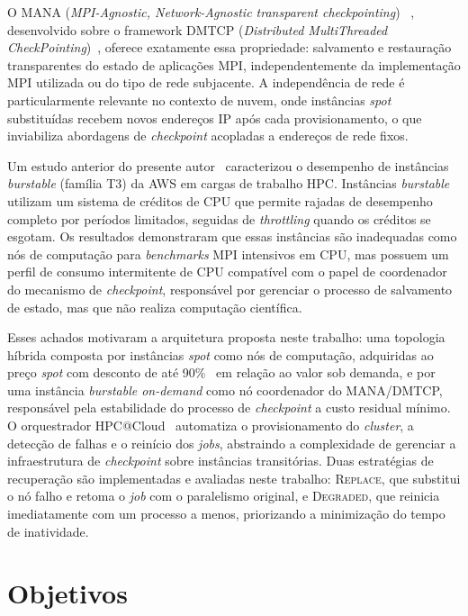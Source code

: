 O MANA (\textit{MPI-Agnostic, Network-Agnostic transparent checkpointing})%
~\cite{garg2019mana,arya2016split}, desenvolvido sobre o framework DMTCP
(\textit{Distributed MultiThreaded CheckPointing})~\cite{ansel2009dmtcp}, oferece
exatamente essa propriedade: salvamento e restauração transparentes do estado de
aplicações MPI, independentemente da implementação MPI utilizada ou do tipo de rede
subjacente. A independência de rede é particularmente relevante no contexto de nuvem,
onde instâncias \textit{spot} substituídas recebem novos endereços IP após cada
provisionamento, o que inviabiliza abordagens de \textit{checkpoint} acopladas a
endereços de rede fixos.

Um estudo anterior do presente autor~\cite{soda2025erad,soda2025wcc} caracterizou o
desempenho de instâncias \textit{burstable} (família T3) da AWS em cargas de trabalho
HPC. Instâncias \textit{burstable} utilizam um sistema de créditos de CPU que permite
rajadas de desempenho completo por períodos limitados, seguidas de \textit{throttling}
quando os créditos se esgotam. Os resultados demonstraram que essas instâncias são
inadequadas como nós de computação para \textit{benchmarks} MPI intensivos em CPU, mas possuem
um perfil de consumo intermitente de CPU compatível com o papel de coordenador do
mecanismo de \textit{checkpoint}, responsável por gerenciar o processo de salvamento
de estado, mas que não realiza computação científica.

Esses achados motivaram a arquitetura proposta neste trabalho: uma topologia híbrida
composta por instâncias \textit{spot} como nós de computação, adquiridas ao preço
\textit{spot} com desconto de até 90\%~\cite{aws2018spot} em relação ao valor sob
demanda, e por uma instância \textit{burstable on-demand} como nó coordenador do
MANA/DMTCP, responsável pela estabilidade do processo de \textit{checkpoint} a custo
residual mínimo. O orquestrador HPC@Cloud~\cite{munhoz2024hpccloud} automatiza o provisionamento
do \textit{cluster}, a detecção de falhas e o reinício dos \textit{jobs}, abstraindo a
complexidade de gerenciar a infraestrutura de \textit{checkpoint} sobre instâncias
transitórias. Duas estratégias de recuperação são implementadas e avaliadas neste
trabalho: \textsc{Replace}, que substitui o nó falho e retoma o \textit{job} com o paralelismo
original, e \textsc{Degraded}, que reinicia imediatamente com um processo a menos,
priorizando a minimização do tempo de inatividade.


\section{Objetivos}
\label{sec:objetivos}

